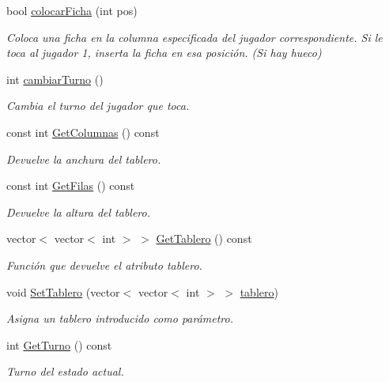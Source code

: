 \begin{DoxyCompactItemize}
bool \hyperlink{classTablero_a24bbcc0cf0a9e464f37a261cd9c6ff45}{colocar\-Ficha} (int pos)
\begin{DoxyCompactList}\small\item\em Coloca una ficha en la columna especificada del jugador correspondiente. Si le toca al jugador 1, inserta la ficha en esa posición. (Si hay hueco) \end{DoxyCompactList}\item 
int \hyperlink{classTablero_a6a07659599bca3442cce101d7bf42b9a}{cambiar\-Turno} ()
\begin{DoxyCompactList}\small\item\em Cambia el turno del jugador que toca. \end{DoxyCompactList}\item 
const int \hyperlink{classTablero_a3cc99292123bdc0c33fcede9ce79e1bf}{Get\-Columnas} () const 
\begin{DoxyCompactList}\small\item\em Devuelve la anchura del tablero. \end{DoxyCompactList}\item 
const int \hyperlink{classTablero_ae8807f83521eb77c8e7b762f9122f51a}{Get\-Filas} () const 
\begin{DoxyCompactList}\small\item\em Devuelve la altura del tablero. \end{DoxyCompactList}\item 
vector$<$ vector$<$ int $>$ $>$ \hyperlink{classTablero_ad9ddec339ebecf5e081433b0509c8c47}{Get\-Tablero} () const 
\begin{DoxyCompactList}\small\item\em Función que devuelve el atributo tablero. \end{DoxyCompactList}\item 
void \hyperlink{classTablero_a811481680b64300b21fb4d1e9619e795}{Set\-Tablero} (vector$<$ vector$<$ int $>$ $>$ \hyperlink{classTablero_a5df607d108c0c0a14aa4f393b7f43030}{tablero})
\begin{DoxyCompactList}\small\item\em Asigna un tablero introducido como parámetro. \end{DoxyCompactList}\item 
int \hyperlink{classTablero_aa4e7d217d20988c41f800b35b1c4129f}{Get\-Turno} () const 
\begin{DoxyCompactList}\small\item\em Turno del estado actual. \end{DoxyCompactList}\item 

\end{DoxyCompactItemize}
